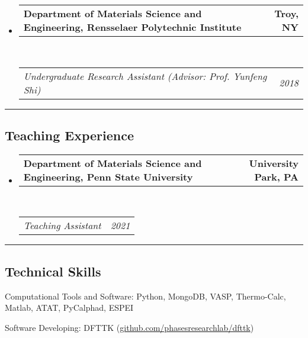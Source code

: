 \documentclass[10pt,letterpaper]{article}
\makeatletter
\newenvironment{indentsection}[1]%
{\begin{list}{}%
  {\setlength{\leftmargin}{#1}}%
  \item[]%
}
{\end{list}}
\newcommand{\headerrow}[2]
{\begin{tabular*}{\linewidth}{l@{\extracolsep{\fill}}r}
  #1 &
  #2 \\
\end{tabular*}}
\makeatother
\begin{document}
\begin{itemize}
  \item
  \headerrow
    {\textbf{Department of Materials Science and Engineering, Rensselaer Polytechnic Institute}}
    {\textbf{Troy, NY}}
  \\
  \headerrow
    {\emph{Undergraduate Research Assistant (Advisor: Prof. Yunfeng Shi)}}
    {\emph{2018}}

\end{itemize}

\hrule
\vspace{-0.6em}
\subsection*{Teaching Experience}

\renewcommand\labelitemiii{$\circ$}
\begin{itemize}
    \parskip=0.1em

    \item
    \headerrow
    {\textbf{Department of Materials Science and Engineering, Penn State University}}
    {\textbf{University Park, PA}}
    \\
    \headerrow
    {\emph{Teaching Assistant}}
    {\emph{2021}}
\end{itemize}



\hrule
\vspace{-0.6em}
\subsection*{Technical Skills}

\begin{indentsection}{\parindent}
\begin{description*}
  \item[Computational Tools and Software:]
  Python, MongoDB, VASP, Thermo-Calc, Matlab, ATAT, PyCalphad, ESPEI
  \item [Software Developing:]
  DFTTK (\href{https://github.com/PhasesResearchLab/DFTTK}{github.com/phasesresearchlab/dfttk})
\end{description*}
\end{indentsection}
\end{document}
